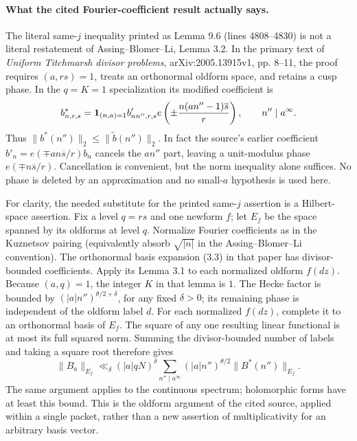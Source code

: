 \paragraph{What the cited Fourier-coefficient result actually says.}
The literal same-$j$ inequality printed as Lemma 9.6 (lines 4808--4830)
is not a literal restatement of Assing--Blomer--Li, Lemma 3.2.
In the primary text of \emph{Uniform Titchmarsh divisor problems},
arXiv:2005.13915v1, pp. 8--11, the proof requires $(a,rs)=1$, treats an
orthonormal oldform space, and retains a cusp phase.  In the $q=K=1$
specialization its modified coefficient is
\begin{equation}\label{eq:l51-abl-phase}
 b^*_{n,r,s}=\mathbf1_{(n,a)=1}b'_{nn'',r,s}
 e\left(\pm {n(an''-1)\overline s\over r}\right),\qquad n''\mid a^\infty.
\end{equation}
Thus $\|b^*(n'')\|_2\leq\|\widetilde b(n'')\|_2$.
In fact the source's earlier coefficient
$b'_n=e(\mp an\overline s/r)b_n$ cancels the $an''$ part, leaving a
unit-modulus phase $e(\mp n\overline s/r)$.  Cancellation is convenient,
but the norm inequality alone suffices.  No phase is deleted by an
approximation and no small-$a$ hypothesis is used here.

For clarity, the needed substitute for the printed same-$j$ assertion
is a Hilbert-space assertion.  Fix a level $q=rs$ and one newform $f$;
let $E_f$ be the space spanned by its oldforms at level $q$.  Normalize
Fourier coefficients as in the Kuznetsov pairing (equivalently absorb
$\sqrt{|n|}$ in the Assing--Blomer--Li convention).  The orthonormal basis
expansion (3.3) in that paper has divisor-bounded coefficients.  Apply its
Lemma 3.1 to each normalized oldform $f(dz)$.  Because $(a,q)=1$, the
integer $K$ in that lemma is $1$.  The Hecke factor is bounded by
$(|a|n'')^{\theta/2+\delta}$, for any fixed $\delta>0$; its remaining
phase is independent of the oldform label $d$.  For each normalized
$f(dz)$, complete it to an orthonormal basis of $E_f$.  The square of any
one resulting linear functional is at most its full squared norm.
Summing the divisor-bounded number of labels and taking a square root
therefore gives
\begin{equation}\label{eq:l51-packet}
 \|B_a\|_{E_f}\ll_\delta (|a|qN)^\delta
 \sum_{n''\mid a^\infty}(|a|n'')^{\theta/2}
 \|B^*(n'')\|_{E_f}.
\end{equation}
The same argument applies to the continuous spectrum; holomorphic
forms have at least this bound.  This is the oldform argument of the
cited source, applied within a single packet, rather than a new assertion
of multiplicativity for an arbitrary basis vector.

